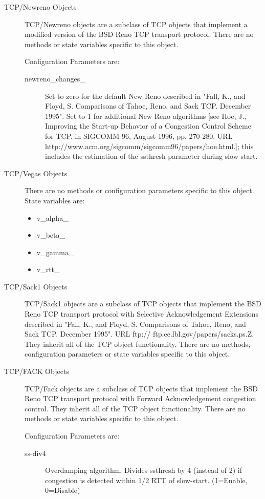 \begin{description}
\item[TCP/Newreno Objects]
TCP/Newreno objects are a subclass of TCP objects that implement a
modified version of the BSD Reno TCP transport protocol. 
There are no methods or state variables specific to this object. 

Configuration Parameters are:
\begin{description}

\item[newreno\_changes\_]
Set to zero for the default New Reno described in "Fall, K., and Floyd, S.
Comparisons of Tahoe, Reno, and Sack TCP. December 1995". Set to 1 for
additional New Reno algorithms [see Hoe, J., Improving the Start-up
Behavior of a Congestion Control Scheme for TCP. in SIGCOMM 96, August
1996, pp. 270-280. URL 
http://www.acm.org/sigcomm/sigcomm96/papers/hoe.html.]; this includes the
estimation of the ssthresh parameter during slow-start. 
\end{description}


\item[TCP/Vegas Objects]
There are no methods or configuration parameters specific to this
object. State variables are:
\begin{itemize}
\item v\_alpha\_
\item v\_beta\_
\item v\_gamma\_
\item v\_rtt\_
\end{itemize}


\item[TCP/Sack1 Objects]
TCP/Sack1 objects are a subclass of TCP objects that implement the BSD
Reno TCP transport protocol with Selective Acknowledgement Extensions
described in "Fall, K., and Floyd, S. Comparisons of Tahoe, Reno, and
Sack TCP. December 1995". URL ftp:// ftp.ee.lbl.gov/papers/sacks.ps.Z. 
They inherit all of the TCP object functionality. There are no methods,
configuration parameters or state variables specific to this object. 


\item[TCP/FACK Objects]
TCP/Fack objects are a subclass of TCP objects that implement the BSD Reno
TCP transport protocol with Forward Acknowledgement congestion control. 
They inherit all of the TCP object functionality. There are no methods or
state variables specific to this object. 

Configuration Parameters are:
\begin{description}
\item[ss-div4]
Overdamping algorithm. Divides ssthresh by 4 (instead of 2) if congestion
is detected within 1/2 RTT of slow-start. (1=Enable, 0=Disable) 


\end{description}
\end{description}

